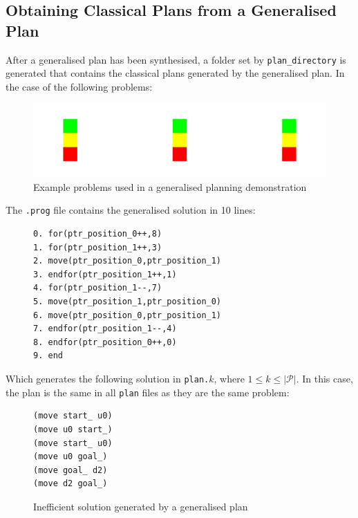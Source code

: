 \subsection{Obtaining Classical Plans from a Generalised Plan}
After a generalised plan has been synthesised, a folder set by \texttt{plan\_directory} is generated that contains the classical plans generated by the generalised plan. In the case of the following problems:

\begin{figure}[h!]
    \centering
    \includegraphics[width=\textwidth]{images/similargenplanning.png}
    \caption{Example problems used in a generalised planning demonstration}
\end{figure}

\newpage
\noindent The \texttt{.prog} file contains the generalised solution in 10 lines:

\begin{figure}[h!]
    \centering
    \begin{BVerbatim}
0. for(ptr_position_0++,8)
1. for(ptr_position_1++,3)
2. move(ptr_position_0,ptr_position_1)
3. endfor(ptr_position_1++,1)
4. for(ptr_position_1--,7)
5. move(ptr_position_1,ptr_position_0)
6. move(ptr_position_0,ptr_position_1)
7. endfor(ptr_position_1--,4)
8. endfor(ptr_position_0++,0)
9. end
    \end{BVerbatim}
\end{figure}

\noindent Which generates the following solution in \texttt{plan.}$k$, where $1 \leq k \leq |\mathcal{P}|$. In this case, the plan is the same in all \texttt{plan} files as they are the same problem:

\begin{figure}[h!]
\centering
\begin{BVerbatim}
(move start_ u0)
(move u0 start_)
(move start_ u0)
(move u0 goal_)
(move goal_ d2)
(move d2 goal_)
\end{BVerbatim}
\caption{Inefficient solution generated by a generalised plan}
\end{figure}